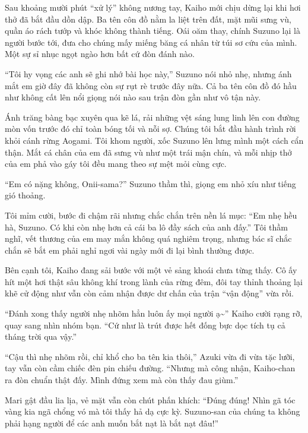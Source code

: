 \documentclass[../main.tex]{subfiles}
\begin{document}
Sau khoảng mười phút ``xử lý'' không nương tay, Kaiho mới chịu dừng lại khi hơi thở đã bắt đầu dồn dập. Ba tên côn đồ nằm la liệt trên đất, mặt mũi sưng vù, quần áo rách tướp và khóc không thành tiếng. Oái oăm thay, chính Suzuno lại là người bước tới, đưa cho chúng mấy miếng băng cá nhân từ túi sơ cứu của mình. Một sự sỉ nhục ngọt ngào hơn bất cứ đòn đánh nào.

``Tôi hy vọng các anh sẽ ghi nhớ bài học này,'' Suzuno nói nhỏ nhẹ, nhưng ánh mắt em giờ đây đã không còn sự rụt rè trước đây nữa. Cả ba tên côn đồ đó hầu như không cất lên nổi giọng nói nào sau trận đòn gần như vô tận này.

\ct

Ánh trăng bàng bạc xuyên qua kẽ lá, rải những vệt sáng lung linh lên con đường mòn vốn trước đó chỉ toàn bóng tối và nỗi sợ. Chúng tôi bắt đầu hành trình rời khỏi cánh rừng Aogami. Tôi khom người, xốc Suzuno lên lưng mình một cách cẩn thận. Mắt cá chân của em đã sưng vù như một trái mận chín, và mỗi nhịp thở của em phả vào gáy tôi đều mang theo sự mệt mỏi cùng cực.

``Em có nặng không, Onii-sama?'' Suzuno thầm thì, giọng em nhỏ xíu như tiếng gió thoảng.

Tôi mỉm cười, bước đi chậm rãi nhưng chắc chắn trên nền lá mục: ``Em nhẹ hều hà, Suzuno. Có khi còn nhẹ hơn cả cái ba lô đầy sách của anh đấy.'' Tôi thầm nghĩ, vết thương của em may mắn không quá nghiêm trọng, nhưng bác sĩ chắc chắn sẽ bắt em phải nghỉ ngơi vài ngày mới đi lại bình thường được.

Bên cạnh tôi, Kaiho đang sải bước với một vẻ sảng khoái chưa từng thấy. Cô ấy hít một hơi thật sâu không khí trong lành của rừng đêm, đôi tay thỉnh thoảng lại khẽ cử động như vẫn còn cảm nhận được dư chấn của trận ``vận động'' vừa rồi.

``Đánh xong thấy người nhẹ nhõm hẳn luôn ấy mọi người ạ\~{}'' Kaiho cười rạng rỡ, quay sang nhìn nhóm bạn. ``Cứ như là trút được hết đống bực dọc tích tụ cả tháng trời qua vậy.''

``Cậu thì nhẹ nhõm rồi, chỉ khổ cho ba tên kia thôi,'' Azuki vừa đi vừa tặc lưỡi, tay vẫn còn cầm chiếc đèn pin chiếu đường. ``Nhưng mà công nhận, Kaiho-chan ra đòn chuẩn thật đấy. Mình đứng xem mà còn thấy đau giùm.''

Mari gật đầu lia lịa, vẻ mặt vẫn còn chút phấn khích: ``Đúng đúng! Nhìn gã tóc vàng kia ngã chổng vó mà tôi thấy hả dạ cực kỳ. Suzuno-san của chúng ta không phải hạng người để các anh muốn bắt nạt là bắt nạt đâu!''
\end{document}
